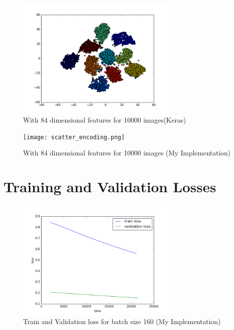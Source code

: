 \documentclass{article}
\begin{document}
\begin{figure}[h]
  \centering
  \includegraphics[width=0.7\textwidth]{keras_lenet/scatter_encoding.png}
  \caption{With 84 dimensional features for 10000 images(Keras)}
\end{figure}

\begin{figure}[h]
  \centering
  \texttt{[image: scatter\_encoding.png]}
  \caption{With 84 dimensional features for 10000 images (My Implementation)}
\end{figure}

\section{Training and Validation Losses}

\begin{figure}[h]
  \centering
  \includegraphics[width=0.7\textwidth]{loss.png}
  \caption{Train and Validation loss for batch size 160 (My Implementation)}
\end{figure}
\end{document}
